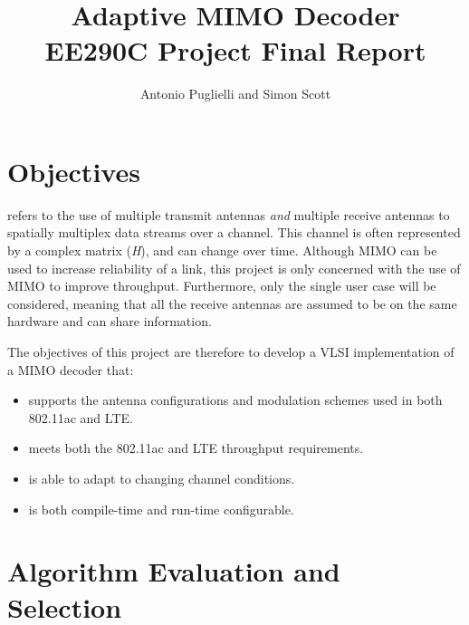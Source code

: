 \documentclass[journal]{IEEEtran}
\begin{document}
\title{Adaptive MIMO Decoder \\ {\Large EE290C Project Final Report}}

%

\author{Antonio Puglielli and Simon Scott}


\maketitle

\section{Objectives}

 refers to the use of multiple transmit antennas {\em and} multiple receive antennas to spatially multiplex data streams over a channel. This channel is often represented by a complex matrix ({\em H}), and can change over time. Although MIMO can be used to increase reliability of a link, this project is only concerned with the use of MIMO to improve throughput. Furthermore, only the single user case will be considered, meaning that all the receive antennas are assumed to be on the same hardware and can share information.

The objectives of this project are therefore to develop a VLSI implementation of a MIMO decoder that:
\begin{itemize}
\item supports the antenna configurations and modulation schemes used in both 802.11ac and LTE.
\item meets both the 802.11ac and LTE throughput requirements.
\item is able to adapt to changing channel conditions.
\item is both compile-time and run-time configurable.
\end{itemize}


\section{Algorithm Evaluation and Selection}
\label{matlab_comparison_section}
\end{document}
